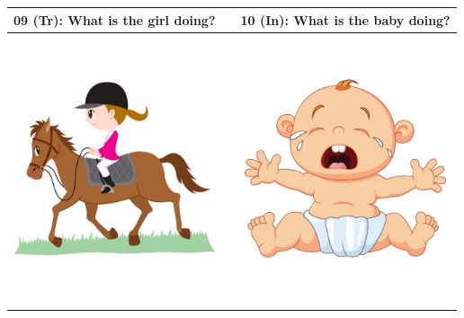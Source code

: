 \documentclass[12pt,notitlepage]{article}
\begin{document}
\begin{center}
\begin{tabular}{|c|c|c|}
\hline
09 (Tr): What is the girl doing? && 10 (In): What is the baby doing? \\
\hline
\includegraphics[width=16em,trim=0 0 0 -3]{figures/I09.jpg} & & \includegraphics[width=16em,trim=0 0 0 -3]{figures/I10.jpg} \\
\hline
\end{tabular}
\vspace{1em} \\



\end{center}
\end{document}
